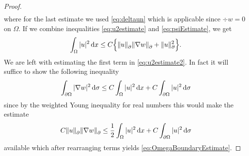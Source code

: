 \begin{proof}
\begin{align}
  \end{align}
  where for the last estimate we used \eqref{eq:deltaun} which is applicable since $\div w = 0$ on $\Omega$.
  If we combine inequalities \eqref{eq:u2estimate} and \eqref{eq:psiEstimate}, we get
  \begin{align}
    \int_\Omega |u|^2 \, {\operatorname{d}\!{x}} \leq C \Big\{ \|u\|^{}_\partial \|\nabla w \|^{}_\partial + \|u\|_\partial^2\Big\}. \label{eq:u2estimate2}
  \end{align}
  We are left with estimating the first term in \eqref{eq:u2estimate2}.
  In fact it will suffice to show the following inequality
  \begin{align}
    \label{eq:w2estimate}
    \int_{\partial\Omega} |\nabla w|^2 \, {\operatorname{d}\!{\sigma}} \leq C \int_\Omega |u|^2 \, {\operatorname{d}\!{x}} + C \int_{\partial\Omega} |u|^2 \, {\operatorname{d}\!{\sigma}}
  \end{align}
  since by the weighted Young inequality for real numbers this would make the estimate
  \begin{align*}
    C \| u\|^{}_\partial \|\nabla w\|^{}_\partial \leq \frac{1}{2} \int_\Omega |u|^2 \, {\operatorname{d}\!{x}} + C \int_{\partial\Omega} |u|^2 \, {\operatorname{d}\!{\sigma}}
  \end{align*}
  available which after rearranging terms yields \eqref{eq:OmegaBoundaryEstimate}.


\end{proof}
